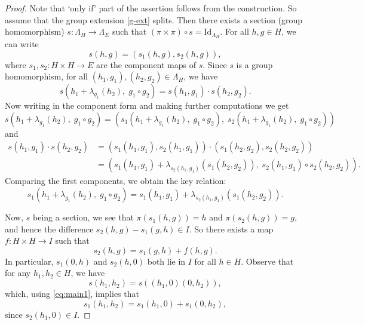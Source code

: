 \documentclass[11pt]{amsart}
\theoremstyle{thrm}
\theoremstyle{plain}
\theoremstyle{definition}
\numberwithin{equation}{section}
\begin{document}
\begin{proof}
Note that `only if' part of the assertion follows from the construction.  So assume that the group extension \eqref{g-ext} splits. Then there exists a section (group homomorphism) 
$s : \Lambda_H \to \Lambda_E$ such that  \( (\pi \times \pi) \circ s = \mathrm{Id}_{\Lambda_H} \). For all \( h, g \in H \), we can write
$$
s(h, g) = (s_1(h, g), s_2(h, g)),$$
where \( s_1, s_2 : H \times H \to E \) are the component maps of $s$.
Since \( s \) is a group homomorphism, for all \( (h_1, g_1), (h_2, g_2) \in \Lambda_H \), we have
$$s(h_1 + \lambda_{g_1}(h_2),\; g_1 \circ g_2) = s(h_1, g_1) \cdot s(h_2, g_2).$$
Now writing in the  component form and making further computations we get
$$s(h_1 + \lambda_{g_1}(h_2),\; g_1 \circ g_2) = (s_1(h_1 + \lambda_{g_1}(h_2),\; g_1 \circ g_2),\; s_2(h_1 + \lambda_{g_1}(h_2),\; g_1 \circ g_2)) $$
and 
\begin{align*}
s(h_1, g_1) \cdot s(h_2, g_2)  &= (s_1(h_1, g_1), s_2(h_1, g_1)) \cdot (s_1(h_2, g_2), s_2(h_2, g_2)) \\
		&= \left(s_1(h_1, g_1) + \lambda_{s_2(h_1, g_1)}(s_1(h_2, g_2)),\; s_2(h_1, g_1) \circ s_2(h_2, g_2)\right).
	\end{align*}
	Comparing the first components, we obtain the key relation:
	\begin{equation}\label{eq:main1}
		s_1(h_1 + \lambda_{g_1}(h_2),\; g_1 \circ g_2) = s_1(h_1, g_1) + \lambda_{s_2(h_1, g_1)}(s_1(h_2, g_2)).
	\end{equation}
	
	Now, $s$ being a section, we see that \( \pi(s_1(h, g)) = h \) and \( \pi(s_2(h, g)) = g \), and hence the difference \( s_2(h, g) - s_1(g, h) \in I \). So there exists a  map \( f : H \times H \to I \) such that 
		\[
	s_2(h, g) = s_1(g, h) + f(h, g).
	\]
 In particular, $s_1(0, h)$ and $s_2(h, 0)$ both lie in $I$ for all $h \in H$. Observe that for any $h_1, h_2 \in H$, we have
	\[
	s(h_1, h_2) = s((h_1, 0)(0, h_2)),
	\]
	which, using \eqref{eq:main1},  implies that
	\begin{equation}\label{eq:addsplit}
		s_1(h_1, h_2) = s_1(h_1, 0) + s_1(0, h_2),
	\end{equation}
	since $s_2(h_1, 0) \in I$.


\end{proof}
\end{document}
